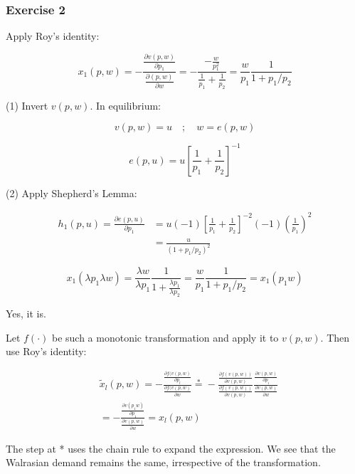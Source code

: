 {
\subsubsection*{Exercise 2}

\begin{enumerate}[label=(\alph*)]
{\item 
Apply Roy's identity:

$$
x_{1}(p, w)=-\frac{\frac{\partial v \left(p, w\right)}{\partial p_{1}}}{\frac{\partial \left(p, w\right)}{\partial w}}=-\frac{-\frac{w}{p_{1}^{2}}}{\frac{1}{p_{1}}+\frac{1}{p_{2}}}=\frac{w}{p_{1} }\frac{1}{1+p_{1} / p_{2}}
$$
}
{\item 
(1) Invert $v(p, w)$. In equilibrium: 

$$
v(p, w)=u \quad ; \quad w=e(p, w)
$$

$$
e(p, u)=u\left[\frac{1}{p_{1}}+\frac{1}{p_{2}}\right]^{-1}
$$

(2) Apply Shepherd's Lemma:

$$
\begin{aligned}
h_{1}(p, u)=\frac{\partial e(p, u)}{\partial p_{1}} & =u(-1)\left[\frac{1}{p_{1}}+\frac{1}{p_{2}}\right]^{-2}(-1)\left(\frac{1}{p_{1}}\right)^{2} \\
& =\frac{u}{\left(1+p_{1} / p_{2}\right)^{2}}
\end{aligned}
$$
}
{\item 
$$
x_{1}\left(\lambda p_{1} \lambda w\right)=\frac{\lambda w}{\lambda p_{1}} \frac{1}{1+\frac{\lambda p_{1}}{\lambda p_{2}}}=\frac{w}{p_{1}} \frac{1}{1+p_{1} / p_{2}}=x_{1}\left(p_{1} w\right)
$$

Yes, it is.
}
{\item 
Let $f(\cdot)$ be such a monotonic transformation and apply it to $v(p, w)$. Then use Roy's identity:

$$
\begin{aligned}
& \tilde{x}_{l}(p, w)=-\frac{\frac{\partial f(v(p, w)}{\partial p_{l}}}{\frac{\partial f(v(p, w)}{\partial w}} \stackrel{*}{=}-\frac{\frac{\partial f(v(p, w))}{\partial v(p, w)}}{\frac{\partial f(v(p, w))}{\partial v(p, w)}} \frac{\frac{\partial v(p, w)}{\partial p_{i}}}{\frac{\partial v(p, w)}{\partial w}} \\
& =-\frac{\frac{\partial v\left(p_{1} w\right)}{\partial p_{1}}}{\frac{\partial v(p, w)}{\partial w}}=x_{l}(p, w)
\end{aligned}
$$

The step at * uses the chain rule to expand the expression. We see that the Walrasian demand remains the same, irrespective of the transformation.
}
\end{enumerate}
}
